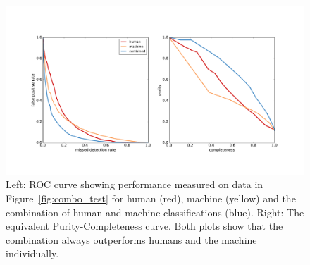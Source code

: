 \documentclass[a4paper,fleqn,usenatbib]{mnras}
\begin{document}
\begin{figure}
   \begin{minipage}{160mm}
     \includegraphics[trim=35mm 35mm 35mm 35mm,clip,width=160mm]{figs/roc.pdf}
   \caption{Left: ROC curve showing performance measured on data in Figure~\ref{fig:combo_test} for human (red), machine (yellow) and
            the combination of human and machine classifications (blue).  Right: The equivalent Purity-Completeness curve.  Both
            plots show that the combination always outperforms humans and the machine individually.} 
   \label{fig:roc} 
   \end{minipage}
\end{figure}

\end{document}
